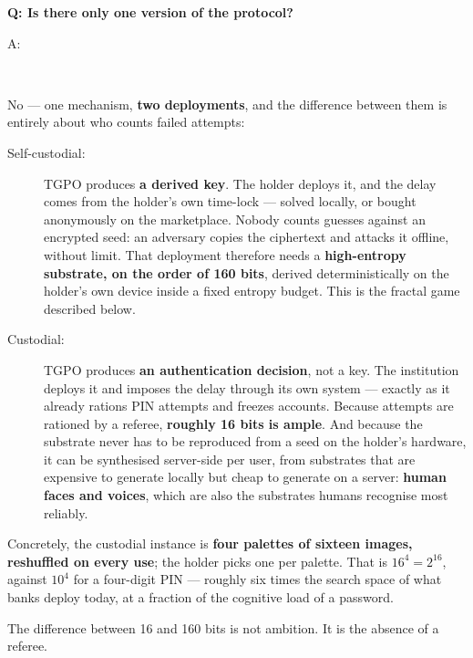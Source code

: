 \documentclass[12pt,a4paper]{article}
\newenvironment{question}[1]{%
  \vspace{0.8em}\noindent\textbf{Q: #1}\par
  \vspace{0.2em}\noindent\begin{itshape}A:\end{itshape}~%
}{\vspace{0.8em}}
\begin{document}
\begin{question}{Is there only one version of the protocol?}
No --- one mechanism, \textbf{two deployments}, and the difference between them is entirely about who counts failed attempts:
\begin{description}
 \item[Self-custodial:] TGPO produces \textbf{a derived key}. The holder deploys it, and the delay comes from the holder's own time-lock --- solved locally, or bought anonymously on the marketplace. Nobody counts guesses against an encrypted seed: an adversary copies the ciphertext and attacks it offline, without limit. That deployment therefore needs a \textbf{high-entropy substrate, on the order of 160 bits}, derived deterministically on the holder's own device inside a fixed entropy budget. This is the fractal game described below.
 \item[Custodial:] TGPO produces \textbf{an authentication decision}, not a key. The institution deploys it and imposes the delay through its own system --- exactly as it already rations PIN attempts and freezes accounts. Because attempts are rationed by a referee, \textbf{roughly 16 bits is ample}. And because the substrate never has to be reproduced from a seed on the holder's hardware, it can be synthesised server-side per user, from substrates that are expensive to generate locally but cheap to generate on a server: \textbf{human faces and voices}, which are also the substrates humans recognise most reliably.
\end{description}
Concretely, the custodial instance is \textbf{four palettes of sixteen images, reshuffled on every use}; the holder picks one per palette. That is $16^4 = 2^{16}$, against $10^4$ for a four-digit PIN --- roughly six times the search space of what banks deploy today, at a fraction of the cognitive load of a password.

The difference between 16 and 160 bits is not ambition. It is the absence of a referee.
\end{question}
\end{document}
